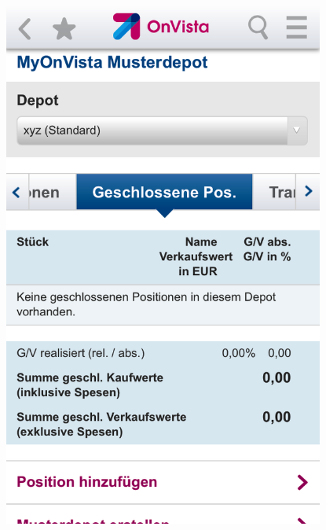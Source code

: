 \begin{figure}[H] 
    \begin{minipage}[b]{.5\linewidth}
        \centering\includegraphics[width=0.94\textwidth]{img/screenshots/ex5p3.png}
    \end{minipage}%
    \begin{minipage}[b]{.5\linewidth}

\end{minipage}
\end{figure}
